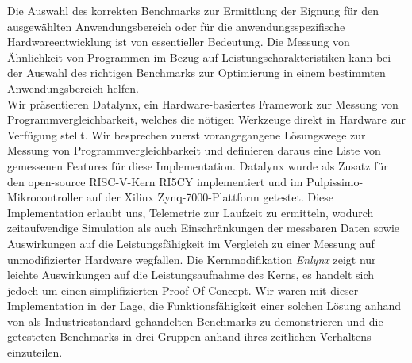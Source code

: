 Die Auswahl des korrekten Benchmarks zur Ermittlung der Eignung für den ausgewählten Anwendungsbereich oder für die anwendungsspezifische Hardwareentwicklung ist von essentieller Bedeutung. Die Messung von Ähnlichkeit von Programmen im Bezug auf Leistungscharakteristiken kann bei der Auswahl des richtigen Benchmarks zur Optimierung in einem bestimmten Anwendungsbereich helfen. \\
Wir präsentieren Datalynx, ein Hardware-basiertes Framework zur Messung von Programmvergleichbarkeit, welches die nötigen Werkzeuge direkt in Hardware zur Verfügung stellt. Wir besprechen zuerst vorangegangene Lösungswege zur Messung von Programmvergleichbarkeit und definieren daraus eine Liste von gemessenen Features für diese Implementation. Datalynx wurde als Zusatz für den open-source RISC-V-Kern RI5CY implementiert und im Pulpissimo-Mikrocontroller auf der Xilinx Zynq-7000-Plattform getestet. Diese Implementation erlaubt uns, Telemetrie zur Laufzeit zu ermitteln, wodurch zeitaufwendige Simulation als auch Einschränkungen der messbaren Daten sowie Auswirkungen auf die Leistungsfähigkeit im Vergleich zu einer Messung auf unmodifizierter Hardware wegfallen. Die Kernmodifikation \emph{Enlynx} zeigt nur leichte Auswirkungen auf die Leistungsaufnahme des Kerns, es handelt sich jedoch um einen simplifizierten Proof-Of-Concept. Wir waren mit dieser Implementation in der Lage, die Funktionsfähigkeit einer solchen Lösung anhand von als Industriestandard gehandelten Benchmarks zu demonstrieren und die getesteten Benchmarks in drei Gruppen anhand ihres zeitlichen Verhaltens einzuteilen.